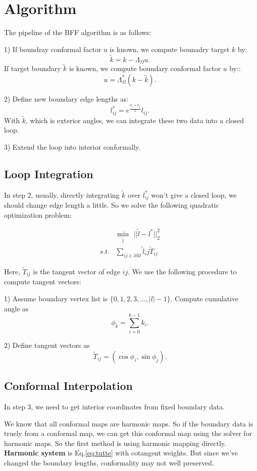 \section{Algorithm}

The pipeline of the BFF algorithm is as follows:

1) If boundray conformal factor ${u}$ is known, we compute bounadry target $k$ by: $$ \tilde{k} = k -\Lambda_{\Omega} u.$$
If target boundary $\tilde{k}$ is known, we compute boundary conformal factor $u$ by:: $$u = \Lambda_{\Omega}^{*}(k - \tilde{k}).$$

2) Define new boundary edge lengths as:
$$l_{ij}^* = e^{\frac{u_i + u_j}{2}}l_{ij}.$$ With $\tilde{k}$, which is exterior angles, we can integrate these two data into a closed loop.

3) Extend the loop into interior conformally.


\subsection{Loop Integration}
In step 2, usually, directly integrating $\tilde{k}$ over $l_{ij}^*$ won't give a closed loop, we should change edge length a little. So we solve the following quadratic optimization problem:

\begin{equation}
\begin{split}
&\min_{\tilde{l}}\ \  ||\tilde{l} - l^*||^2_2\\
s.t. & \sum_{ij\in \partial M} \tilde{l}_ij \tilde{T}_{ij}
\end{split}
\end{equation}

Here, $\tilde{T}_{ij}$ is the tangent vector of edge $ij$. We use the following procedure to compute tangent vectors:

1) Assume boundary vertex list is $\{0,1,2,3,...,|l|-1\}$. Compute cumulative angle as $$\phi_k = \sum_{i = 0}^{k-1}k_i.$$

2) Define tangent vectors as $$\tilde{T}_{ij} = (\cos {\phi_i}, \sin {\phi_j}).$$

\subsection{Conformal Interpolation}
In step 3, we need to get interior coordinates from fixed boundary data.

We know that all conformal maps are harmonic maps. So if the boundary data is truely from a conformal map, we can get this conformal map using the solver for harmonic maps. So the first method is using harmonic mapping directly. \textbf{Harmonic system} is Eq.\ref{eq:tutte} with cotangent weights.
But since we've changed the boundary lengths, conformality may not well preserved. 

